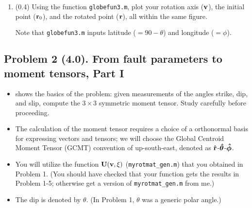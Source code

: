 \documentclass[11pt,titlepage,fleqn]{article}
\newcommand{\rotangB}{\xi}    %
\newcommand{\rotvec}{\bv}      %
\begin{document}
\begin{enumerate}
\item (0.4) Using the function \verb+globefun3.m+, plot your rotation axis ($\rotvec$), the initial point ($\mbox{${\bf r}$}_0$), and the rotated point ($\mbox{${\bf r}$}$), all within the same figure.

Note that \verb+globefun3.m+ inputs latitude ($=90-\theta$) and longitude ($=\phi$).

\end{enumerate}


\subsection*{Problem 2 (4.0). From fault parameters to moment tensors, Part I}

\begin{itemize}
\item {} shows the basics of the problem: given measurements of the angles strike, dip, and slip, compute the $3 \times 3$ symmetric moment tensor. Study  carefully before proceeding.

\item The calculation of the moment tensor requires a choice of a orthonormal basis for expressing vectors and tensors; we will choose the Global Centroid Moment Tensor (GCMT) convention of up-south-east, denoted as $\mbox{\boldmath{$\hat{\rm r}$}}$-$\mbox{\boldmath{$\hat{\theta}$}}$-$\mbox{\boldmath{$\hat{\phi}$}}$.

\item You will utilize the function $\bU(\rotvec,\rotangB)$ (\verb+myrotmat_gen.m+) that you obtained in Problem 1. (You should have checked that your function gets the results in Problem 1-5; otherwise get a version of \verb+myrotmat_gen.m+ from me.)

\item The dip is denoted by $\theta$. (In Problem 1, $\theta$ was a generic polar angle.)

\end{itemize}
\end{document}
